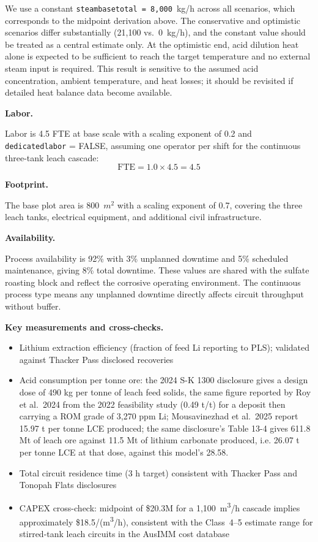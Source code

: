 \documentclass{article}
\renewcommand\_{\textunderscore\allowbreak}
\begin{document}
We use a constant \texttt{steam\_base\_total = 8,000}~kg/h across all scenarios, which corresponds to the midpoint derivation above. The conservative and optimistic scenarios differ substantially (21,100 vs.\ 0~kg/h), and the constant value should be treated as a central estimate only. At the optimistic end, acid dilution heat alone is expected to be sufficient to reach the target temperature and no external steam input is required. This result is sensitive to the assumed acid concentration, ambient temperature, and heat losses; it should be revisited if detailed heat balance data become available.

\medskip
\noindent\textbf{Labor.}\quad

Labor is 4.5 FTE at base scale with a scaling exponent of 0.2 and \texttt{dedicated\_labor} = FALSE, assuming one operator per shift for the continuous three-tank leach cascade:
\[
	\text{FTE} = 1.0 \times 4.5 = 4.5
\]

\medskip
\noindent\textbf{Footprint.}\quad

The base plot area is 800~$\si{m^2}$ with a scaling exponent of 0.7, covering the three leach tanks, electrical equipment, and additional civil infrastructure.

\medskip
\noindent\textbf{Availability.}\quad

Process availability is 92\% with 3\% unplanned downtime and 5\% scheduled maintenance, giving 8\% total downtime. These values are shared with the sulfate roasting block and reflect the corrosive operating environment. The continuous process type means any unplanned downtime directly affects circuit throughput without buffer.

\medskip
\noindent\textbf{Key measurements and cross-checks.}\quad
\begin{itemize}[noitemsep]
    \item Lithium extraction efficiency (fraction of feed Li reporting to PLS); validated against Thacker Pass disclosed recoveries
    \item Acid consumption per tonne ore: the 2024 S-K 1300 disclosure gives a design dose of 490 kg  per tonne of leach feed solids, the same figure reported by Roy et al.\ 2024 from the 2022 feasibility study (0.49 t/t) for a deposit then carrying a ROM grade of 3,270 ppm Li; Mousavinezhad et al.\ 2025 report 15.97 t  per tonne LCE produced; the same disclosure's Table 13-4 gives 611.8 Mt of leach ore against 11.5 Mt of lithium carbonate produced, i.e. 26.07 t  per tonne LCE at that dose, against this model's 28.58. 
    \item Total circuit residence time (3 h target) consistent with Thacker Pass and Tonopah Flats disclosures
    \item CAPEX cross-check: midpoint of \$20.3M for a 1,100~\si{m^3/h} cascade implies approximately \$18.5/(\si{m^3/h}), consistent with the Class~4--5 estimate range for stirred-tank leach circuits in the AusIMM cost database
\end{itemize}
\end{document}
